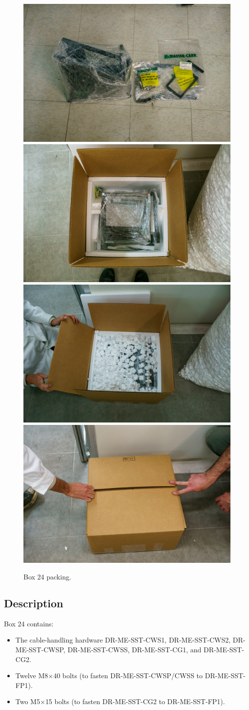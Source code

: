\documentclass{article}
\begin{document}
\begin{figure}[bp]
\begin{center}
\includegraphics[width=0.40\linewidth]{figures/20201208T183054.jpg}
\includegraphics[width=0.40\linewidth]{figures/20201208T183316.jpg}\\[\smallskipamount]
\includegraphics[width=0.40\linewidth]{figures/20201208T183414.jpg}
\includegraphics[width=0.40\linewidth]{figures/20201208T183627.jpg}
\end{center}
\caption{Box 24 packing.}
\label{figure:box-twenty-four-b}
\end{figure}

\subsection{Description}

Box 24 contains:

\begin{itemize}
    \item The cable-handling hardware DR-ME-SST-CWS1, DR-ME-SST-CWS2, DR-ME-SST-CWSP, DR-ME-SST-CWSS, DR-ME-SST-CG1, and 
DR-ME-SST-CG2.
\item Twelve M8$\times$40 bolts (to fasten DR-ME-SST-CWSP/CWSS to DR-ME-SST-FP1).
\item Two M5$\times$15 bolts (to fasten DR-ME-SST-CG2 to DR-ME-SST-FP1).
\end{itemize}
\end{document}
